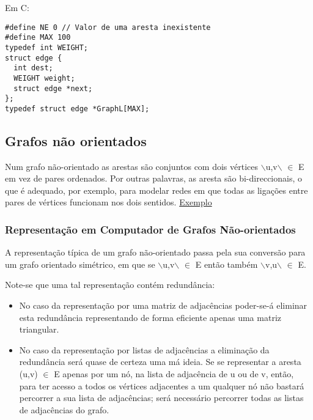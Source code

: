 \documentclass[11pt]{article}
\begin{document}
Em C:
\begin{verbatim}
#define NE 0 // Valor de uma aresta inexistente
#define MAX 100
typedef int WEIGHT;
struct edge {
  int dest;
  WEIGHT weight;
  struct edge *next;
};
typedef struct edge *GraphL[MAX];
\end{verbatim}

\subsection{Grafos não orientados}
\label{sec:orgb13d44a}
Num grafo não-orientado as arestas são conjuntos com dois vértices $\backslash${u,v$\backslash$} \(\in\) E em vez de pares ordenados. Por outras palavras, as aresta são bi-direccionais, o que é adequado, por exemplo, para modelar redes em que todas as ligações entre pares de vértices funcionam nos dois sentidos.
\href{./nao\_orientado\_grafo.png}{Exemplo}

\subsubsection{Representação em Computador de Grafos Não-orientados}
\label{sec:orgb61ab0f}
A representação típica de um grafo não-orientado passa pela sua conversão para um grafo orientado simétrico, em que se $\backslash${u,v$\backslash$} \(\in\) E então também $\backslash${v,u$\backslash$} \(\in\) E.

Note-se que uma tal representação contém redundância:


\begin{itemize}
\item No caso da representação por uma matriz de adjacências poder-se-á eliminar esta redundância representando de forma eficiente apenas uma matriz triangular.
\end{itemize}


\begin{itemize}
\item No caso da representação por listas de adjacências a eliminação da redundância será quase de certeza uma má ideia. Se se representar a aresta (u,v) \(\in\) E apenas por um nó, na lista de adjacência de u ou de v, então, para ter acesso a todos os vértices adjacentes a um qualquer nó não bastará percorrer a sua lista de adjacências; será necessário percorrer todas as listas de adjacências do grafo.
\end{itemize}
\end{document}
